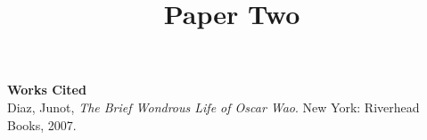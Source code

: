 \documentclass[12pt]{article}
\title{Paper Two}
\date{}
\begin{document}
\maketitle
\doublespacing


\thispagestyle{firststyle}


\begin{center}
  \textbf{Works Cited} \\
Diaz, Junot, \textit{The Brief Wondrous Life of Oscar Wao}. New York: Riverhead Books, 2007.
\end{center}
\end{document}
